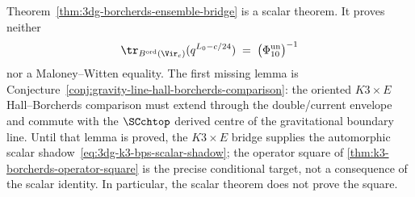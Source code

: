 \begin{remark}
\label{rem:3dg-borcherds-bridge-caveats}
Theorem~\ref{thm:3dg-borcherds-ensemble-bridge} is a scalar theorem.
It proves neither
\[
\tr_{B^{\mathrm{ord}}(\Vir_c)}(q^{L_0-c/24})
\;=\;
\bigl(\Phi_{10}^{\mathrm{un}}\bigr)^{-1}
\]
nor a Maloney--Witten equality. The first missing lemma is
Conjecture~\ref{conj:gravity-line-hall-borcherds-comparison}: the
oriented $K3\times E$ Hall--Borcherds comparison must extend through
the double/current envelope and commute with the $\SCchtop$ derived
centre of the gravitational boundary line. Until that lemma is
proved, the $K3\times E$ bridge supplies the automorphic scalar
shadow~\eqref{eq:3dg-k3-bps-scalar-shadow}; the operator square of
\cref{thm:k3-borcherds-operator-square} is the precise conditional
target, not a consequence of the scalar identity. In particular, the
scalar theorem does not prove the square.
\end{remark}

